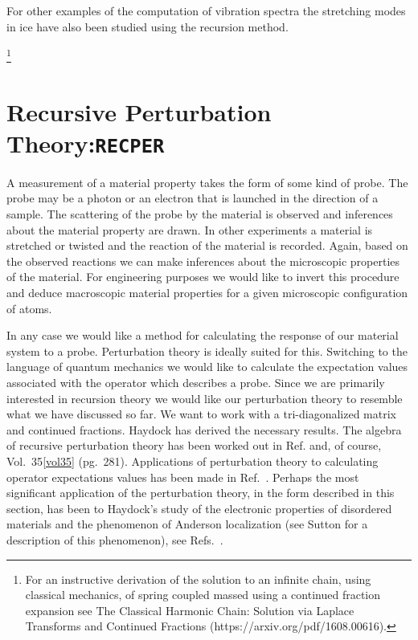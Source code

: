 For other examples of the computation of vibration spectra the stretching modes 
in ice have also been studied using the recursion method\cite{mcgra78,bergren82}.

\footnote{For an instructive derivation of the solution to an infinite 
chain, using classical mechanics, of spring coupled massed using a continued fraction expansion see 
The Classical Harmonic Chain: Solution via Laplace Transforms and Continued Fractions 
(https://arxiv.org/pdf/1608.00616).}

\section{Recursive Perturbation Theory:\texttt{RECPER}}
A measurement of a material property takes the form of some kind of probe. 
The probe may be a photon or an electron that is launched in the direction of a sample. 
The scattering of the probe by the material is observed and inferences about the material
property are drawn. In other experiments a material is stretched or 
twisted and the reaction of the material is recorded.
Again, based on the observed reactions
we can make inferences about the microscopic properties of the material.
For engineering purposes we would like to invert this procedure and deduce
macroscopic material properties for a given microscopic configuration of atoms.

In any case we would like a method for calculating the response of our material system
to a probe. Perturbation theory is ideally suited for this. Switching to the language of quantum
mechanics we would like to calculate the expectation values associated with the operator 
which describes a probe. Since we are primarily interested in recursion theory we would like
our perturbation theory to resemble what we have discussed so far. We want to work with a tri-diagonalized
matrix and continued fractions. Haydock has derived the necessary results.
The algebra of recursive perturbation theory has been worked out
in Ref.\cite{haydock77} and, of course, Vol.~35\ref{vol35} (pg.~281). Applications
of perturbation theory to calculating operator expectations values has been made in Ref.~\cite{mclean77,foulkes86}.
Perhaps the most significant application of the perturbation theory, in the form described in this section,
has been to Haydock's study of the electronic properties of disordered materials and 
the phenomenon of Anderson localization (see Sutton \cite{sutton} for a description of this phenomenon),
see Refs.~\cite{haydock78,haydock81b,haydock81c,haydock86}.

